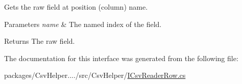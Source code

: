 Gets the raw field at position (column) name. 


\begin{DoxyParams}{Parameters}
{\em name} & The named index of the field.\\
\hline
\end{DoxyParams}
\begin{DoxyReturn}{Returns}
The raw field.
\end{DoxyReturn}


The documentation for this interface was generated from the following file\-:\begin{DoxyCompactItemize}
\item 
packages/\-Csv\-Helper..../src/\-Csv\-Helper/\hyperlink{a00208}{I\-Csv\-Reader\-Row.\-cs}\end{DoxyCompactItemize}
